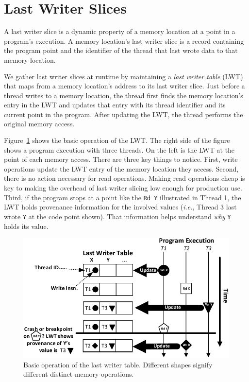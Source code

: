 \documentclass[preprint,9pt]{sigplanconf}
\newcommand{\lwt}{LWT\xspace}
\begin{document}
\section{Last Writer Slices}
\label{sec:lastwriterslices}
A last writer slice is a dynamic property of a memory location at a point in a
program's execution.   A memory location's last writer slice is a record
containing the program point and the identifier of the thread that last wrote
data to that memory location.  


We gather last writer slices at runtime by maintaining a {\em last writer
table} (\lwt) that maps from a memory location's address to its last writer
slice.  Just before a thread writes to a memory location, the thread first
finds the memory location's entry in the \lwt and updates that entry with its
thread identifier and its current point in the program.  After updating the
\lwt, the thread performs the original memory access.  


Figure~\ref{fig:basicLWT} shows the basic operation of the \lwt.  The right
side of the figure shows a program execution with three threads.  On the left
is the \lwt at the point of each memory access.  There are three key things to
notice.  First, write operations update the \lwt entry of the memory location
they access.  Second, there is no action necessary for read operations.  Making
read operations cheap is key to making the overhead of last writer slicing low
enough for production use.  Third, if the program stops at a point like the
{\tt Rd Y} illustrated in Thread 1, the \lwt holds provenance information for
the involved values ({\em i.e.}, Thread 3 last wrote {\tt Y} at the code point
shown). That information helps understand {\em why} {\tt Y} holds its value.


\begin{figure}[h]
\centering
\includegraphics[scale=.6]{figs/BasicLWT.pdf}
\caption{\label{fig:basicLWT}Basic operation of the last writer table. Different shapes signify different distinct memory operations. }
\end{figure}
\end{document}
